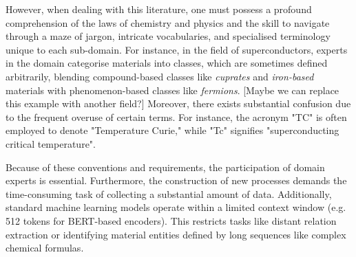 However, when dealing with this literature, one must possess a profound comprehension of the laws of chemistry and physics and the skill to navigate through a maze of jargon, intricate vocabularies, and specialised terminology unique to each sub-domain. 
For instance, in the field of superconductors, experts in the domain categorise materials into classes, which are sometimes defined arbitrarily, blending compound-based classes like \textit{cuprates} and \textit{iron-based} materials with phenomenon-based classes like \textit{fermions}. 
[Maybe we can replace this example with another field?]
Moreover, there exists substantial confusion due to the frequent overuse of certain terms. For instance, the acronym "TC" is often employed to denote "Temperature Curie," while "Tc" signifies "superconducting critical temperature".


Because of these conventions and requirements, the participation of domain experts is essential.
Furthermore, the construction of new processes demands the time-consuming task of collecting a substantial amount of data.
Additionally, standard machine learning models operate within a limited context window (e.g. 512 tokens for BERT-based encoders). This restricts tasks like distant relation extraction or identifying material entities defined by long sequences like complex chemical formulas.

